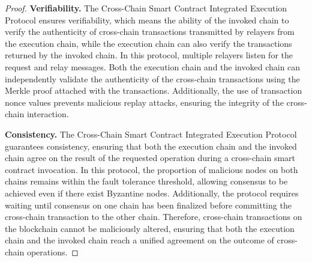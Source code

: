 \begin{proof}
\vspace{3pt}
\noindent
\textbf{Verifiability. }
The Cross-Chain Smart Contract Integrated Execution Protocol ensures verifiability, which means the ability of the invoked chain to verify the authenticity of cross-chain transactions transmitted by relayers from the execution chain, while the execution chain can also verify the transactions returned by the invoked chain. 
In this protocol, multiple relayers listen for the request and relay messages.
Both the execution chain and the invoked chain can independently validate the authenticity of the cross-chain transactions using the Merkle proof attached with the transactions. 
Additionally, the use of transaction nonce values prevents malicious replay attacks, ensuring the integrity of the cross-chain interaction.

\vspace{3pt}
\noindent
\textbf{Consistency. }
The Cross-Chain Smart Contract Integrated Execution Protocol guarantees consistency, ensuring that both the execution chain and the invoked chain agree on the result of the requested operation during a cross-chain smart contract invocation. 
In this protocol, the proportion of malicious nodes on both chains remains within the fault tolerance threshold, allowing consensus to be achieved even if there exist Byzantine nodes. 
Additionally, the protocol requires waiting until consensus on one chain has been finalized before committing the cross-chain transaction to the other chain.
Therefore, cross-chain transactions on the blockchain cannot be maliciously altered, ensuring that both the execution chain and the invoked chain reach a unified agreement on the outcome of cross-chain operations.
\end{proof}


